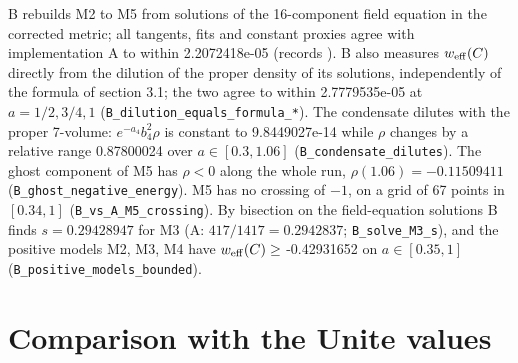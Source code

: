 \documentclass[11pt]{article}
\begin{document}
B rebuilds M2 to M5 from solutions of the 16-component field equation in the corrected metric; all tangents, fits and constant proxies agree with implementation A to within 2.2072418e-05 (records \texttt{}). B also measures $w_{\rm eff}(C)$ directly from the dilution of the proper density of its solutions, independently of the formula of section 3.1; the two agree to within 2.7779535e-05 at $a = 1/2, 3/4, 1$ (\texttt{B\_diluti\allowbreak{}on\_equal\allowbreak{}s\_formul\allowbreak{}a\_*}). The condensate dilutes with the proper 7-volume: $e^{-a_4}b_4^2\rho$ is constant to 9.8449027e-14 while $\rho$ changes by a relative range 0.87800024 over $a \in [0.3, 1.06]$ (\texttt{B\_conden\allowbreak{}sate\_dil\allowbreak{}utes}). The ghost component of M5 has $\rho < 0$ along the whole run, $\rho(1.06) = -0.11509411$ (\texttt{B\_ghost\_\allowbreak{}negative\allowbreak{}\_energy}). M5 has no crossing of $-1$, on a grid of 67 points in $[0.34, 1]$ (\texttt{B\_vs\_A\_M\allowbreak{}5\_crossi\allowbreak{}ng}). By bisection on the field-equation solutions B finds $s = 0.29428947$ for M3 (A: $417/1417 = 0.2942837$; \texttt{B\_solve\_\allowbreak{}M3\_s}), and the positive models M2, M3, M4 have $w_{\rm eff}(C) \geq$ -0.42931652 on $a \in [0.35, 1]$ (\texttt{B\_positi\allowbreak{}ve\_model\allowbreak{}s\_bounde\allowbreak{}d}).

\section{Comparison with the Unite values}
\end{document}
